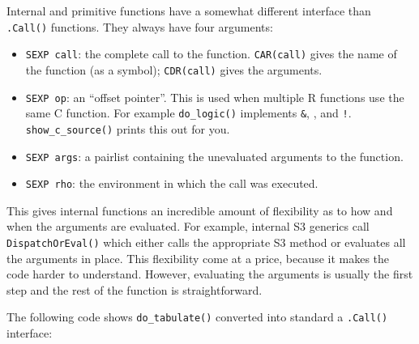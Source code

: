 Internal and primitive functions have a somewhat different interface
than \texttt{.Call()} functions. They always have four arguments:

\begin{itemize}
\item
  \texttt{SEXP call}: the complete call to the function.
  \texttt{CAR(call)} gives the name of the function (as a symbol);
  \texttt{CDR(call)} gives the arguments.
\item
  \texttt{SEXP op}: an ``offset pointer''. This is used when multiple R
  functions use the same C function. For example \texttt{do\_logic()}
  implements \texttt{\&}, \texttt{\textbar{}}, and \texttt{!}.
  \texttt{show\_c\_source()} prints this out for you.
\item
  \texttt{SEXP args}: a pairlist containing the unevaluated arguments to
  the function.
\item
  \texttt{SEXP rho}: the environment in which the call was executed.
\end{itemize}

This gives internal functions an incredible amount of flexibility as to
how and when the arguments are evaluated. For example, internal S3
generics call \texttt{DispatchOrEval()} which either calls the
appropriate S3 method or evaluates all the arguments in place. This
flexibility come at a price, because it makes the code harder to
understand. However, evaluating the arguments is usually the first step
and the rest of the function is straightforward.

The following code shows \texttt{do\_tabulate()} converted into standard
a \texttt{.Call()} interface:

\begin{Shaded}
\end{Shaded}

